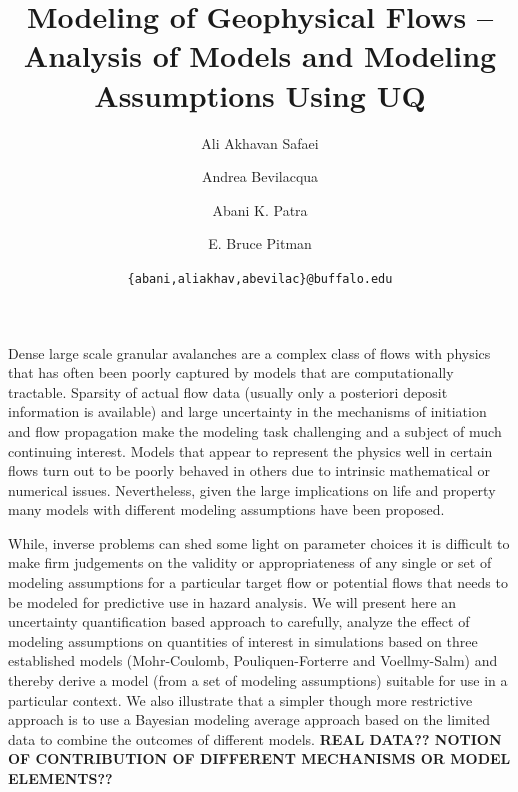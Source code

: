 \documentclass{article}
\begin{document}
\title{\bf Modeling of Geophysical Flows -- Analysis of Models and Modeling Assumptions Using UQ}
\author[1]{ Ali Akhavan Safaei}
\author[2]{Andrea Bevilacqua}
\author[1,3]{Abani K. Patra}
\author[4]{E. Bruce Pitman}


\date{\texttt{\{abani,aliakhav,abevilac\}@buffalo.edu}}


\maketitle

\abstract
Dense large scale granular avalanches are a complex class of flows with physics that has often been poorly captured by models that are computationally tractable. Sparsity of actual flow data (usually only a posteriori  deposit information is available) and large uncertainty in the mechanisms of initiation and flow propagation make the modeling task challenging and a
subject of much continuing interest. Models that appear to represent the physics well
 in certain flows turn out to be poorly behaved in others due to intrinsic mathematical or numerical issues.
Nevertheless, given the large implications on life and property many models with different modeling assumptions have been proposed.

While, inverse problems can shed some light on parameter choices it is difficult to make firm judgements on the validity or appropriateness of any single or set of modeling assumptions for a particular target flow or potential flows that needs to be modeled for predictive use in hazard analysis. We will present here an uncertainty quantification  based approach to carefully, analyze the effect of modeling assumptions on quantities of
interest in simulations based on three established models (Mohr-Coulomb, Pouliquen-Forterre and Voellmy-Salm) and thereby derive a model (from a set of modeling assumptions) suitable for use in a particular context. We also illustrate that a simpler though more restrictive approach is to use a Bayesian modeling average approach based on the limited data to combine the outcomes of different models.
{\bf  REAL DATA?? NOTION OF CONTRIBUTION OF DIFFERENT MECHANISMS OR MODEL ELEMENTS??}
\newpage
\end{document}

